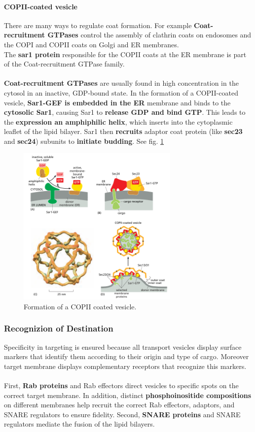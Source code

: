 \documentclass[../main.tex]{subfiles}
\begin{document}
\paragraph{COPII-coated vesicle}
There are many ways to regulate coat formation. For example \textbf{Coat-recruitment GTPases} control the assembly of clathrin coats on endosomes and the COPI and COPII coats on Golgi and ER membranes.\\
The \textbf{\gls{sar1} protein} responsible for the COPII coats at the ER membrane is part of the Coat-recruitment GTPase family. \\
\\
\textbf{Coat-recruitment GTPases} are usually found in high concentration in the cytosol in an inactive, GDP-bound state. In the formation of a COPII-coated vesicle, \textbf{Sar1-GEF is embedded in the ER} membrane and binds to the \textbf{cytosolic Sar1}, causing Sar1 to \textbf{release GDP and bind GTP}. This leads to the \textbf{expression an amphiphilic helix}, which inserts into the cytoplasmic leaflet of the lipid bilayer. Sar1 then \textbf{recruits} adaptor coat protein (like \textbf{\gls{sec23}} and \textbf{\gls{sec24}}) subunits to \textbf{initiate budding}. See fig. \ref{COPII}

\begin{figure}[H]
	\centering
	\includegraphics[width=0.7\textwidth]{11}
	\caption{Formation of a COPII coated vesicle.}
	\label{COPII}
\end{figure}


\subsubsection{Recognizion of Destination}
Specificity in targeting is ensured because all transport vesicles display surface markers that identify them according to their origin and type of cargo. Moreover target membrane displays complementary receptors that recognize this markers. \\
\\
First, \textbf{Rab proteins} and Rab effectors direct vesicles to specific spots on the correct target membrane. In addition, distinct \textbf{phosphoinositide compositions} on different membranes help recruit the correct Rab effectors, adaptors, and SNARE regulators to ensure fidelity. Second, \textbf{SNARE proteins} and SNARE regulators mediate the fusion of the lipid bilayers.
\end{document}
